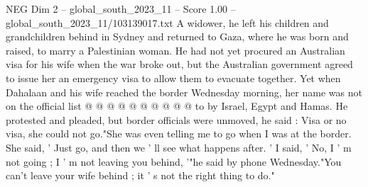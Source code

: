 \begin{textsample}{NEG Dim 2 – global\_south\_2023\_11 – Score 1.00 – global\_south\_2023\_11/103139017.txt}
A widower, he left his children and grandchildren behind in Sydney and returned to Gaza, where he was born and raised, to marry a Palestinian woman.
He had not yet procured an Australian visa for his wife when the war broke out, but the Australian government agreed to issue her an emergency visa to allow them to evacuate together.
Yet when Dahalaan and his wife reached the border Wednesday morning, her name was not on the official list @ @ @ @ @ @ @ @ @ @ to by Israel, Egypt and Hamas.
He protested and pleaded, but border officials were unmoved, he said : Visa or no visa, she could not go."She was even telling me to go when I was at the border.
She said, ' Just go, and then we ' ll see what happens after. ' I said, ' No, I ' m not going ; I ' m not leaving you behind, '"he said by phone Wednesday."You can't leave your wife behind ; it ' s not the right thing to do."

\end{textsample}
